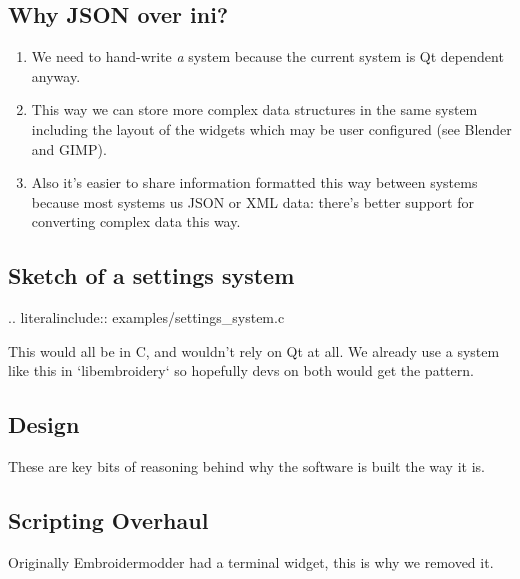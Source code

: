 \documentclass[10pt]{report}
\begin{document}
\subsection{Why JSON over ini?}

\begin{enumerate}
\item We need to hand-write \emph{a} system because the current system is Qt dependent anyway.
\item This way we can store more complex data structures in the same system including the layout of the widgets which may be user configured (see Blender and GIMP).
\item Also it's easier to share information formatted this way between systems because most systems us JSON or XML data: there's better support for converting complex data this way.
\end{enumerate}

\subsection{Sketch of a settings system}

.. literalinclude:: examples/settings\_system.c

This would all be in C, and wouldn't rely on Qt at all. We already use a
system like this in `libembroidery` so hopefully devs on both
would get the pattern.

\subsection{Design}

These are key bits of reasoning behind why the software is built the way
it is.

\subsection{Scripting Overhaul}

Originally Embroidermodder had a terminal widget, this is why we removed
it.
\end{document}
